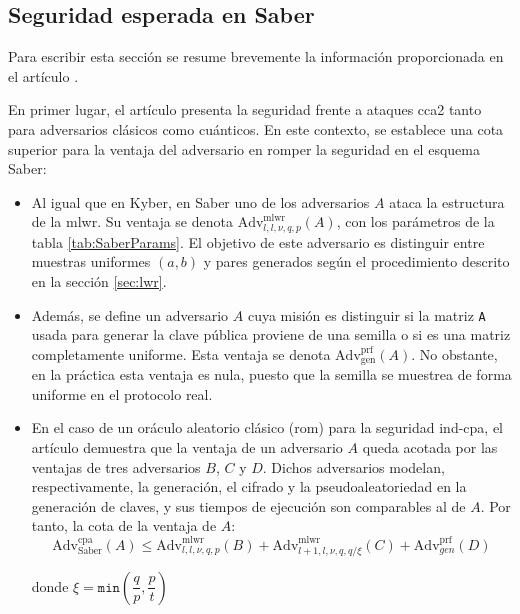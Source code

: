 \subsection{Seguridad esperada en Saber}
Para escribir esta sección se resume brevemente la información proporcionada en el artículo \cite{saber-spec-2020}.
\newline

En primer lugar, el artículo presenta la seguridad frente a ataques \acrshort{cca2} tanto para adversarios clásicos como cuánticos. En este contexto, se establece una cota superior para la ventaja del adversario en romper la seguridad en el esquema Saber:
\begin{itemize}

	\item Al igual que en Kyber, en Saber uno de los adversarios \(A\) ataca la estructura de la \acrshort{mlwr}. Su ventaja se denota \(\mathrm{Adv}^{\mathrm{mlwr}}_{l,l,\nu,q,p}(A)\), con los parámetros de la tabla \ref{tab:SaberParams}. El objetivo de este adversario es distinguir entre muestras uniformes \((a,b)\) y pares generados según el procedimiento descrito en la sección \ref{sec:lwr}.
	\item Además, se define un adversario \(A\) cuya misión es distinguir si la matriz \texttt{A} usada para generar la clave pública proviene de una semilla o si es una matriz completamente uniforme. Esta ventaja se denota \(\mathrm{Adv}^{\mathrm{prf}}_{\mathrm{gen}}(A)\). No obstante, en la práctica esta ventaja es nula, puesto que la semilla se muestrea de forma uniforme en el protocolo real.
	
	\item En el caso de un oráculo aleatorio clásico (\acrshort{rom}) para la seguridad \acrshort{ind}-\acrshort{cpa}, el artículo demuestra que la ventaja de un adversario \(A\) queda acotada por las ventajas de tres adversarios \(B\), \(C\) y \(D\). Dichos adversarios modelan, respectivamente, la generación, el cifrado y la pseudoaleatoriedad en la generación de claves, y sus tiempos de ejecución son comparables al de \(A\). Por tanto, la cota de la ventaja de \(A\):	
	\begin{equation}
		\text{Adv}^{\text{cpa}}_{\text{Saber}}(A)\le 
			\text{Adv}^{\text{mlwr}}_{l,l,\nu,q,p}(B)+
			\text{Adv}^{\text{mlwr}}_{l+1,l,\nu,q,q/\xi}(C)+
			\text{Adv}^{\text{prf}}_{gen}(D)
	\end{equation}
	
	donde \(\xi=\texttt{min}\left(\dfrac{q}{p},\dfrac{p}{t}\right)\) 
	

\end{itemize}
